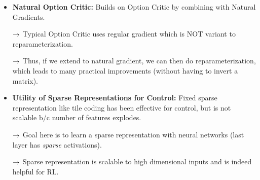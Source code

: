 \begin{itemize}
    \item {\bf Natural Option Critic:} Builds on Option Critic by combining with Natural Gradients.
    
    $\rightarrow$ Typical Option Critic uses regular gradient which is NOT variant to reparameterization.
    
    $\rightarrow$ Thus, if we extend to natural gradient, we can then do reparameterization, which leads to many practical improvements (without having to invert a matrix).
    
    \item {\bf Utility of Sparse Representations for Control:} Fixed sparse representation like tile coding has been effective for control, but is not scalable b/c number of features explodes.
    
    $\rightarrow$ Goal here is to learn a sparse representation with neural networks (last layer has {\it sparse} activations).
    
    $\rightarrow$ Sparse representation is scalable to high dimensional inputs and is indeed helpful for RL.
    
    
\end{itemize}
